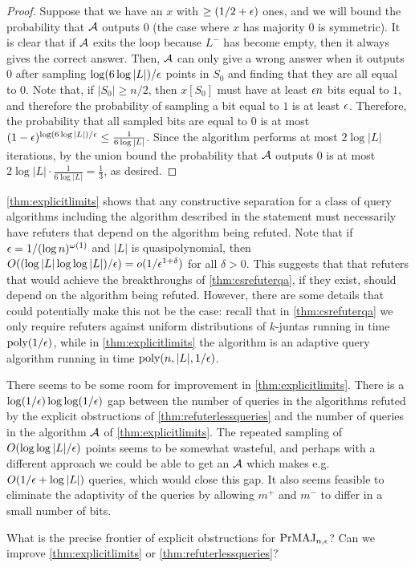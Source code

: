 \begin{proof}
Suppose that we have an $x$ with $\geq (1/2 + \epsilon)$ ones, and we will bound the probability that $\mathcal{A}$ outputs $0$ (the
case where $x$ has majority $0$ is symmetric).
It is clear that if $\mathcal{A}$ exits the loop because $L^-$ has become empty, then it always gives the correct answer.
Then, $\mathcal{A}$ can only give a wrong answer when it outputs $0$ after sampling $\log (6 \log |L|)/\epsilon$ points in $S_0$
and finding that they are all equal to $0$. 
Note that, if $|S_0| \geq n/2$, then $x[S_0]$ must have
at least $\epsilon n$ bits equal to $1$, and therefore the probability of sampling a bit equal to $1$ is at least $\epsilon$.
Therefore, the probability that all sampled bits are equal to $0$ is at most 
$(1-\epsilon)^{\log (6 \log |L|)/\epsilon} \leq \frac{1}{6 \log |L|}$. 
Since the algorithm performs at most $2 \log |L|$ iterations,
by the union bound the probability that $\mathcal{A}$ outputs $0$
is at most $2 \log |L| \cdot \frac{1}{6 \log |L|} = \frac{1}{3}$, as desired. 



\end{proof}


\cref{thm:explicitlimits} shows that any constructive separation for a class of query algorithms including the algorithm described in 
the statement must necessarily have refuters that depend on the algorithm being refuted. 
Note that if $\epsilon = 1/(\log n)^{\omega(1)}$ and $|L|$ is quasipolynomial, then $O((\log |L| \log \log |L|)/\epsilon) = o(1/\epsilon^{1+\delta})$ for all 
$\delta > 0$. 
This suggests that that refuters that would achieve the breakthroughs of \cref{thm:csrefuterqa},
if they exist, should depend on the algorithm being refuted.
However, there are some details that could potentially make this not be the case: recall that
in \cref{thm:csrefuterqa} we only require refuters against uniform distributions of $k$-juntas
running in time $\text{poly}(1/\epsilon)$,
while in \cref{thm:explicitlimits} the algorithm is an adaptive
query algorithm running in time $\text{poly}(n, |L|, 1/\epsilon)$. 

There seems to be some room for improvement in \cref{thm:explicitlimits}.
There is a $\log (1/\epsilon) \log \log (1/\epsilon)$ gap between the number of 
queries in the algorithms refuted by the explicit obstructions of \cref{thm:refuterlessqueries}
and the number of queries in the 
algorithm $\mathcal{A}$ of \cref{thm:explicitlimits}.
The repeated sampling of $O(\log \log |L|/\epsilon)$ points seems to be somewhat wasteful, and 
perhaps with a different approach we could be able to get an $\mathcal{A}$ which makes e.g. $O(1/\epsilon + \log |L|)$ queries, 
which would close this gap.
It also seems feasible to eliminate the adaptivity of the queries by allowing $m^+$ and $m^-$
to differ in a small number of bits.  

\begin{question}
What is the precise frontier of explicit obstructions for $\mathrm{PrMAJ}_{n, \epsilon}$? Can we improve \cref{thm:explicitlimits} or \cref{thm:refuterlessqueries}?
\end{question}